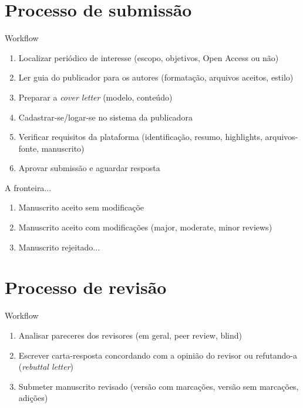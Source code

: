 
\section{Processo de submissão}

\begin{frame}{Workflow}
\begin{enumerate}
\item Localizar periódico de interesse (escopo, objetivos, Open Access ou não)
\item Ler guia do publicador para os autores (formatação, arquivos aceitos, estilo) 
\item Preparar a \emph{cover letter} (modelo, conteúdo) 
\item Cadastrar-se/logar-se no sistema da publicadora
\item Verificar requisitos da plataforma (identificação, resumo, highlights, arquivos-fonte, manuscrito)
\item Aprovar submissão e aguardar resposta
\end{enumerate}
\end{frame}

\begin{frame}{A fronteira...}
\begin{enumerate}
\item Manuscrito aceito sem modificaçõe 
\item Manuscrito aceito com modificações (major, moderate, minor reviews) 
\item Manuscrito rejeitado... 
\end{enumerate}
\end{frame}

\section{Processo de revisão}

\begin{frame}{Workflow}
\begin{enumerate}
\item Analisar pareceres dos revisores (em geral, peer review, blind)
\item Escrever carta-resposta concordando com a opinião do revisor ou refutando-a  (\emph{rebuttal letter})
\item Submeter manuscrito revisado (versão com marcações, versão sem marcações, adições) 
\end{enumerate}
\end{frame}

